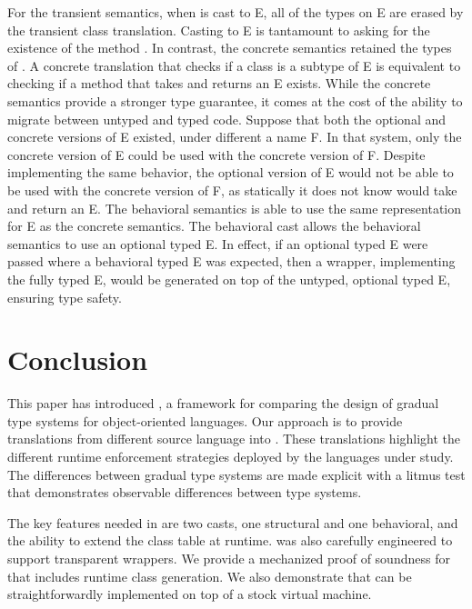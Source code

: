 \documentclass[runnningheads]{tex/llncs}
\begin{document}
For the transient semantics, when \x is cast to {\xt E}, all of the types on
{\xt E} are erased by the transient class translation. Casting to {\xt E} is
tantamount to asking for the existence of the method \m. In contrast, the
concrete semantics retained the types of \m. A concrete translation that
checks if a class is a subtype of {\xt E} is equivalent to checking if a
method \m that takes and returns an {\xt E} exists.  While the concrete
semantics provide a stronger type guarantee, it comes at the cost of the
ability to migrate between untyped and typed code. Suppose that both the
optional and concrete versions of {\xt E} existed, under different a name
{\xt F}. In that system, only the concrete version of {\xt E} could be used
with the concrete version of {\xt F}. Despite implementing the same
behavior, the optional version of {\xt E} would not be able to be used with
the concrete version of {\xt F}, as statically it does not know \m would
take and return an {\xt E}.  The behavioral semantics is able to use the
same representation for {\xt E} as the concrete semantics. The behavioral
cast allows the behavioral semantics to use an optional typed {\xt E}. In
effect, if an optional typed {\xt E} were passed where a behavioral typed
{\xt E} was expected, then a wrapper, implementing the fully typed {\xt E},
would be generated on top of the untyped, optional typed {\xt E}, ensuring
type safety.


\section{Conclusion}\label{litm}

This paper has introduced \kafka, a framework for comparing the design of
gradual type systems for object-oriented languages. Our approach is to
provide translations from different source language into \kafka. These
translations highlight the different runtime enforcement strategies deployed
by the languages under study. The differences between gradual type systems
are made explicit with a litmus test that demonstrates observable
differences between type systems. 

The key features needed in \kafka are two casts, one structural and one
behavioral, and the ability to extend the class table at runtime.  \kafka
was also carefully engineered to support transparent wrappers.  We provide a
mechanized proof of soundness for \kafka that includes runtime class
generation.  We also demonstrate that \kafka can be straightforwardly
implemented on top of a stock virtual machine.
\end{document}
